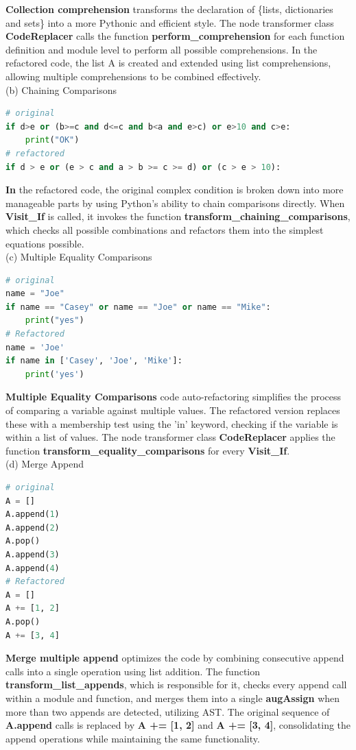 \documentclass[11pt]{article}
\begin{document}
\textbf{Collection comprehension} transforms the declaration of \{lists, dictionaries and sets\} into a more Pythonic and efficient style. The node transformer class \textbf{CodeReplacer} calls the function \textbf{perform\_comprehension} for each function definition and module level to perform all possible comprehensions. In the refactored code, the list A is created and extended using list comprehensions, allowing multiple comprehensions to be combined effectively. \\

(b) Chaining Comparisons
\begin{lstlisting}[language=python]
# original
if d>e or (b>=c and d<=c and b<a and e>c) or e>10 and c>e:
    print("OK")
# refactored
if d > e or (e > c and a > b >= c >= d) or (c > e > 10):
\end{lstlisting}

\textbf {In} the refactored code, the original complex condition is broken down into more manageable parts by using Python's ability to chain comparisons directly. When \textbf{Visit\_If} is called, it invokes the function \textbf{transform\_chaining\_comparisons}, which checks all possible combinations and refactors them into the simplest equations possible.\\

(c) Multiple Equality Comparisons
\begin{lstlisting}[language=python]
# original
name = "Joe"
if name == "Casey" or name == "Joe" or name == "Mike":
    print("yes")
# Refactored
name = 'Joe'
if name in ['Casey', 'Joe', 'Mike']:
    print('yes')
\end{lstlisting}

\textbf{Multiple Equality Comparisons} code auto-refactoring simplifies the process of comparing a variable against multiple values. The refactored version replaces these with a membership test using the 'in' keyword, checking if the variable is within a list of values. The node transformer class \textbf{CodeReplacer} applies the function \textbf{transform\_equality\_comparisons} for every \textbf{Visit\_If}. \\

(d) Merge Append
\begin{lstlisting}[language=python]
# original
A = []
A.append(1)
A.append(2)
A.pop()
A.append(3)
A.append(4)
# Refactored
A = []
A += [1, 2]
A.pop()
A += [3, 4]
\end{lstlisting}

\textbf{Merge multiple append} optimizes the code by combining consecutive append calls into a single operation using list addition. The function \textbf{transform\_list\_appends}, which is responsible for it, checks every append call within a module and function, and merges them into a single \textbf{augAssign} when more than two appends are detected, utilizing AST. The original sequence of \textbf{A.append} calls is replaced by \textbf{A += [1, 2]} and \textbf{A += [3, 4]}, consolidating the append operations while maintaining the same functionality. \\
\end{document}
